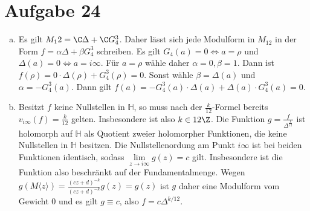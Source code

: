 \documentclass{article}
\begin{document}
  \section*{Aufgabe 24}
  \begin{enumerate}[(a)]
    \item Es gilt $M_12 = \C \Delta + \C G_4^3$. Daher lässt sich jede Modulform in $M_{12}$ in der Form $f = \alpha \Delta + \beta G_4^3$ schreiben. Es gilt $G_4(a) = 0 \Leftrightarrow a = \rho$ und $\Delta(a) = 0 \Leftrightarrow a = i\infty$. Für $a = \rho$ wähle daher $\alpha = 0, \beta = 1$. Dann ist $f(\rho) = 0 \cdot \Delta(\rho) + G_4^3(\rho) = 0$. Sonst wähle $\beta = \Delta(a)$ und $\alpha = - G_4^3(a)$. Dann gilt $f(a) = - G_4^3(a) \cdot \Delta(a) + \Delta(a) \cdot G_4^3(a) = 0$.
    \item Besitzt $f$ keine Nullstellen in $\mathbb{H}$, so muss nach der $\frac{k}{12}$-Formel bereits $v_{i\infty}(f) = \frac{k}{12}$ gelten. Insbesondere ist also $k \in 12\Z$. Die Funktion $g = \frac{f}{\Delta^{\frac{k}{12}}}$ ist holomorph auf $\mathbb{H}$ als Quotient zweier holomorpher Funktionen, die keine Nullstellen in $\mathbb{H}$ besitzen. Die Nullstellenordung am Punkt $i\infty$ ist bei beiden Funktionen identisch, sodass $\lim\limits_{z \to i\infty} g(z) = c$ gilt. Insbesondere ist die Funktion also beschränkt auf der Fundamentalmenge.
    Wegen $g(M\langle z \rangle) = \frac{(cz + d)^{-k}}{(cz + d)^{-k}} g(z) = g(z)$ ist $g$ daher eine Modulform vom Gewicht 0 und es gilt $g \equiv c$, also $f = c \Delta^{k/12}$. 
  \end{enumerate}
\end{document}
